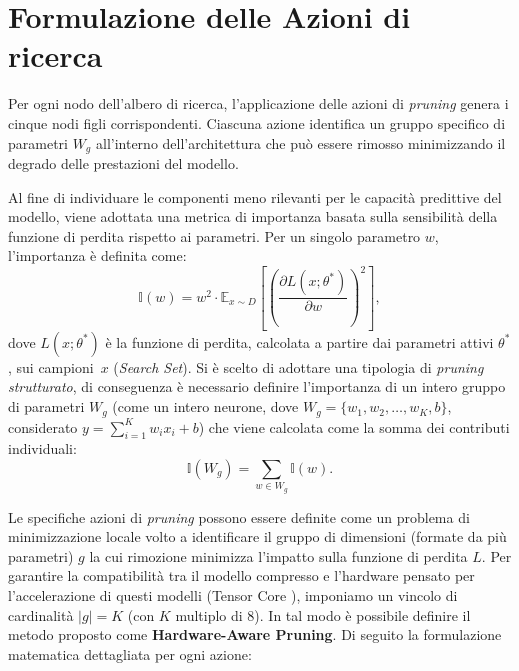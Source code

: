 \section{Formulazione delle Azioni di ricerca}
\label{section:math_actions}
Per ogni nodo dell'albero di ricerca, l'applicazione delle azioni di
\textit{pruning} genera i cinque nodi figli corrispondenti. Ciascuna azione
identifica un gruppo specifico di parametri ${W}_g$ all'interno
dell'architettura che può essere rimosso minimizzando il degrado delle
prestazioni del modello. \par
Al fine di individuare le componenti meno rilevanti per le capacità predittive
del modello, viene adottata una metrica di importanza basata sulla sensibilità
della funzione di perdita rispetto ai parametri. Per un singolo parametro $w$,
l'importanza è definita come:
\begin{equation} \label{eq:metrica_importanza}
    {\mathbb{I}}(w) = w^2 \cdot \mathbb{E}_{x \sim {D}} \left[ \left( \frac{\partial {L}(x; \theta^*)}{\partial w} \right)^2 \right],
\end{equation}
dove ${L}(x; \theta^*)$ è la funzione di perdita, calcolata a partire dai parametri attivi $\theta^*$, sui campioni~$x$ (\textit{Search Set}).
Si è scelto di adottare una tipologia di \textit{pruning strutturato}, di conseguenza è necessario definire l'importanza di un intero gruppo di parametri ${W}_g$ (come un intero neurone, dove ${W}_g = \{w_1, w_2, \ldots, w_K, b\}$, considerato $y = \sum_{i=1}^{K} w_i x_i + b$) che viene calcolata come la somma dei contributi individuali:
\begin{equation}
    {\mathbb{I}}({W}_g) = \sum_{w \in {W}_g} {\mathbb{I}}(w).
\end{equation}

Le specifiche azioni di \textit{pruning} possono essere definite come un
problema di minimizzazione locale volto a identificare il gruppo di dimensioni
(formate da più parametri) $g$ la cui rimozione minimizza l'impatto sulla
funzione di perdita ${L}$. Per garantire la compatibilità tra il modello
compresso e l'hardware pensato per l'accelerazione di questi modelli (Tensor
Core \cite{TensorCores}), imponiamo un vincolo di cardinalità $|g| = K$ (con
$K$ multiplo di 8). In tal modo è possibile definire il metodo proposto come
\textbf{Hardware-Aware Pruning}. Di seguito la formulazione matematica
dettagliata per ogni azione:

